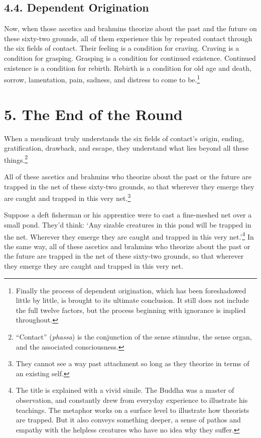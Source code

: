 \documentclass[12pt,openany]{book}%
\begin{document}
\subsection*{4.4. Dependent Origination }

Now, when those ascetics and brahmins theorize about the past and the future on these sixty-two grounds, all of them experience this by repeated contact through the six fields of contact. Their feeling is a condition for craving. Craving is a condition for grasping. Grasping is a condition for continued existence. Continued existence is a condition for rebirth. Rebirth is a condition for old age and death, sorrow, lamentation, pain, sadness, and distress to come to be.\footnote{Finally the process of dependent origination, which has been foreshadowed little by little, is brought to its ultimate conclusion. It still does not include the full twelve factors, but the process beginning with ignorance is implied throughout. } 

\section*{5. The End of the Round }

When a mendicant truly understands the six fields of contact’s origin, ending, gratification, drawback, and escape, they understand what lies beyond all these things.\footnote{“Contact” (\textit{phassa}) is the conjunction of the sense stimulus, the sense organ, and the associated consciousness. } 

All of these ascetics and brahmins who theorize about the past or the future are trapped in the net of these sixty-two grounds, so that wherever they emerge they are caught and trapped in this very net.\footnote{They cannot see a way past attachment so long as they theorize in terms of an existing self. } 

Suppose a deft fisherman or his apprentice were to cast a fine-meshed net over a small pond. They’d think: ‘Any sizable creatures in this pond will be trapped in the net. Wherever they emerge they are caught and trapped in this very net.’\footnote{The title is explained with a vivid simile. The Buddha was a master of observation, and constantly drew from everyday experience to illustrate his teachings. The metaphor works on a surface level to illustrate how theorists are trapped. But it also conveys something deeper, a sense of pathos and empathy with the helpless creatures who have no idea why they suffer. } In the same way, all of these ascetics and brahmins who theorize about the past or the future are trapped in the net of these sixty-two grounds, so that wherever they emerge they are caught and trapped in this very net. 
\end{document}
